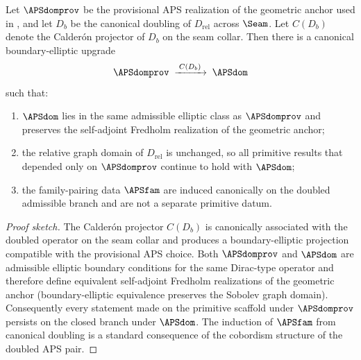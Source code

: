 \begin{theorem}
\label{thm:apsdom-upgrade}
Let $\APSdomprov$ be the provisional APS realization of the geometric anchor used in
, and let $D_b$ be the canonical doubling of
$D_{\mathrm{rel}}$ across $\Seam$. Let $C(D_b)$ denote the Calder\'on projector of $D_b$ on the
seam collar. Then there is a canonical boundary-elliptic upgrade
\[
\APSdomprov
\;\xrightarrow{\;C(D_b)\;}\;
\APSdom
\]
such that:
\begin{enumerate}[label=(\roman*), leftmargin=1.5em, topsep=3pt, itemsep=2pt]
    \item $\APSdom$ lies in the same admissible elliptic class as $\APSdomprov$ and preserves the
    self-adjoint Fredholm realization of the geometric anchor;
    \item the relative graph domain of $D_{\mathrm{rel}}$ is unchanged, so all primitive results
    that depended only on $\APSdomprov$ continue to hold with $\APSdom$;
    \item the family-pairing data $\APSfam$ are induced canonically on the doubled admissible
    branch and are not a separate primitive datum.
\end{enumerate}
\end{theorem}

\begin{proof}[Proof sketch]
The Calder\'on projector $C(D_b)$ is canonically associated with the doubled operator on the
seam collar and produces a boundary-elliptic projection compatible with the provisional APS
choice. Both $\APSdomprov$ and $\APSdom$ are admissible elliptic boundary conditions for the
same Dirac-type operator and therefore define equivalent self-adjoint Fredholm realizations of
the geometric anchor (boundary-elliptic equivalence preserves the Sobolev graph domain).
Consequently every statement made on the primitive scaffold under $\APSdomprov$ persists on the
closed branch under $\APSdom$. The induction of $\APSfam$ from canonical doubling is a standard
consequence of the cobordism structure of the doubled APS pair.
\end{proof}

